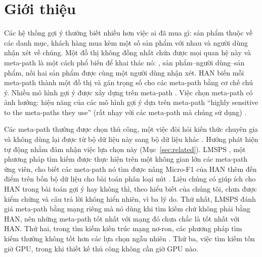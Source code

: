 \section{Giới thiệu}
\label{sec:intro}

Các hệ thống gợi ý thường biết nhiều hơn việc ai đã mua gì: sản phẩm thuộc về các danh mục, khách
hàng mua kèm một số sản phẩm với nhau và người dùng nhận xét về chúng. Một đồ thị không đồng nhất
chứa được mọi quan hệ này và meta-path là một cách phổ biến để khai thác nó:
, sản phẩm--người dùng--sản phẩm, nối hai sản phẩm được cùng một người dùng nhận xét.
HAN \citep{wang2019heterogeneous} biến mỗi meta-path thành một đồ thị và gán trọng số cho các
meta-path bằng cơ chế chú ý. Nhiều mô hình gợi ý được xây dựng trên meta-path
\citep{hu2018leveraging,shi2020hgrec,mu2021fhrec,yan2021attention}. Việc chọn meta-path có ảnh
hưởng: hiệu năng của các mô hình gợi ý dựa trên meta-path
``\foreignlanguage{english}{highly sensitive to the meta-paths they use}'' (rất nhạy với các meta-path mà chúng sử dụng) \citep{ning2022automatic}.

Các meta-path thường được chọn thủ công, một việc đòi hỏi kiến thức chuyên gia và không dùng lại
được từ bộ dữ liệu này sang bộ dữ liệu khác \citep[][Phụ lục~D]{han2020genetic,li2024longrange}.
Hướng phát hiện tự động nhằm đảm nhận việc lựa chọn này (Mục~\ref{sec:related}). LMSPS
\citep{li2024longrange}, một phương pháp tìm kiếm được thực hiện trên một không gian lớn các
meta-path ứng viên, cho biết các meta-path nó tìm được nâng Micro-F1 của HAN thêm
 đến  điểm trên bốn bộ dữ liệu cho bài toán phân loại nút
\citep[Bảng~4]{li2024longrange}. Liệu chúng có giúp ích cho HAN trong bài toán gợi ý hay không
thì, theo hiểu biết của chúng tôi, chưa được kiểm chứng và câu trả lời không hiển nhiên, vì ba lý do.
Thứ nhất, LMSPS đánh giá meta-path bằng mạng riêng mà nó dùng khi tìm kiếm chứ không phải bằng HAN,
nên những meta-path tốt nhất với mạng đó chưa chắc là tốt nhất với HAN. Thứ hai, trong tìm kiếm kiến trúc mạng nơ-ron, các phương pháp tìm kiếm thường không tốt
hơn các lựa chọn ngẫu nhiên \citep{li2019random,yu2020evaluating}. Thứ ba, việc tìm kiếm tốn giờ
GPU, trong khi thiết kế thủ công không cần giờ GPU nào.

